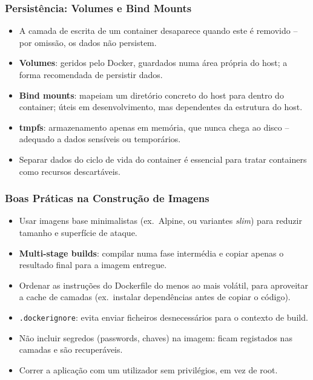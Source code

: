 \documentclass[aspectratio=169]{beamer}
\begin{document}
\begin{frame}
\frametitle{Persistência: Volumes e Bind Mounts}
\begin{itemize}
    \setlength\itemsep{0.4cm}
    \item A camada de escrita de um container desaparece quando este é removido -- por omissão, os dados não persistem.
    \item \textbf{Volumes}: geridos pelo Docker, guardados numa área própria do host; a forma recomendada de persistir dados.
    \item \textbf{Bind mounts}: mapeiam um diretório concreto do host para dentro do container; úteis em desenvolvimento, mas dependentes da estrutura do host.
    \item \textbf{tmpfs}: armazenamento apenas em memória, que nunca chega ao disco -- adequado a dados sensíveis ou temporários.
    \item Separar dados do ciclo de vida do container é essencial para tratar containers como recursos descartáveis.
\end{itemize}
\end{frame}

\begin{frame}
\frametitle{Boas Práticas na Construção de Imagens}
\begin{itemize}
    \setlength\itemsep{0.4cm}
    \item Usar imagens base minimalistas (ex.\ Alpine, ou variantes \textit{slim}) para reduzir tamanho e superfície de ataque.
    \item \textbf{Multi-stage builds}: compilar numa fase intermédia e copiar apenas o resultado final para a imagem entregue.
    \item Ordenar as instruções do Dockerfile do menos ao mais volátil, para aproveitar a cache de camadas (ex.\ instalar dependências antes de copiar o código).
    \item \texttt{.dockerignore}: evita enviar ficheiros desnecessários para o contexto de build.
    \item Não incluir segredos (passwords, chaves) na imagem: ficam registados nas camadas e são recuperáveis.
    \item Correr a aplicação com um utilizador sem privilégios, em vez de root.
\end{itemize}
\end{frame}
\end{document}
